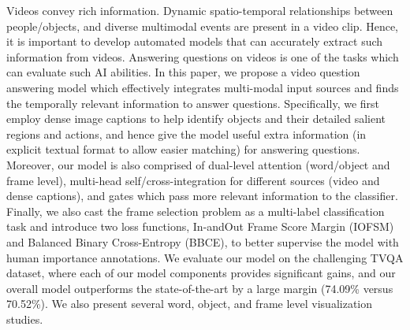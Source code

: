 Videos convey rich information. Dynamic spatio-temporal relationships between people/objects, and diverse multimodal events are present in a video clip. Hence, it is important to develop automated models that can accurately extract such information from videos. Answering questions on videos is one of the tasks which can evaluate such AI abilities. In this paper, we propose a video question answering model which effectively integrates multi-modal input sources and finds the temporally relevant information to answer questions. Specifically, we first employ dense image captions to help identify objects and their detailed salient regions and actions, and hence give the model useful extra information (in explicit textual format to allow easier matching) for answering questions. Moreover, our model is also comprised of dual-level attention (word/object and frame level), multi-head self/cross-integration for different sources (video and dense captions), and gates which pass more relevant information to the classifier. Finally, we also cast the frame selection problem as a multi-label classification task and introduce two loss functions, In-andOut Frame Score Margin (IOFSM) and Balanced Binary Cross-Entropy (BBCE), to better supervise the model with human importance annotations. We evaluate our model on the challenging TVQA dataset, where each of our model components provides significant gains, and our overall model outperforms the state-of-the-art by a large margin (74.09\% versus 70.52\%). We also present several word, object, and frame level visualization studies.
